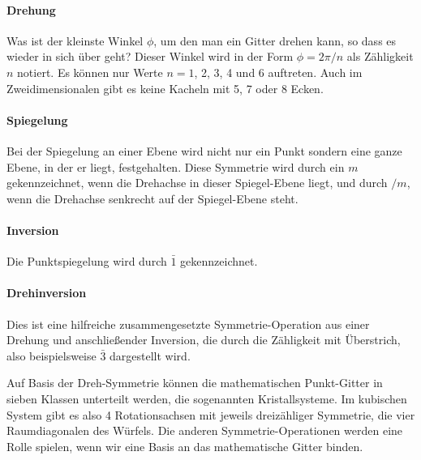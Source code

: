 \paragraph{Drehung} Was ist der kleinste Winkel $\phi$, um den man ein Gitter drehen kann, so dass es wieder in sich über geht? Dieser Winkel wird in der Form $\phi = 2 \pi / n$ als Zähligkeit $n$ notiert. Es können nur Werte $n= 1$, 2, 3, 4 und 6 auftreten. Auch im Zweidimensionalen gibt es keine Kacheln mit 5, 7 oder 8 Ecken.

\paragraph{Spiegelung} Bei der Spiegelung an einer Ebene wird nicht nur ein Punkt sondern eine ganze Ebene, in der er liegt, festgehalten. Diese Symmetrie wird durch ein $m$ gekennzeichnet, wenn die Drehachse in dieser Spiegel-Ebene liegt, und durch $/m$, wenn die Drehachse senkrecht auf der Spiegel-Ebene steht.

\paragraph{Inversion} Die Punktspiegelung wird durch $\bar{1}$ gekennzeichnet.

\paragraph{Drehinversion} Dies ist eine hilfreiche zusammengesetzte Symmetrie-Operation aus einer Drehung und anschließender Inversion, die durch die Zähligkeit mit Überstrich, also beispielsweise $\bar{3}$ dargestellt wird. 

Auf Basis der Dreh-Symmetrie können die mathematischen Punkt-Gitter in sieben Klassen unterteilt werden, die sogenannten Kristallsysteme. Im kubischen System gibt es also 4 Rotationsachsen mit jeweils dreizähliger Symmetrie, die vier Raumdiagonalen des Würfels. Die anderen Symmetrie-Operationen werden eine Rolle spielen, wenn wir eine Basis an das mathematische Gitter binden.



